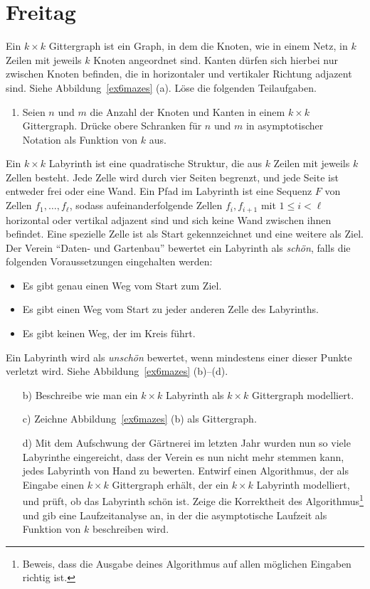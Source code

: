 \documentclass{uebung_cs}
\begin{document}
\section*{Freitag}

\begin{aufgabe}
	Ein $k\times k$ Gittergraph ist ein Graph, in dem die Knoten, wie in einem Netz, in $k$ Zeilen mit jeweils $k$ Knoten angeordnet sind.
	Kanten dürfen sich hierbei nur zwischen Knoten befinden, die in horizontaler und vertikaler Richtung adjazent sind.
	Siehe Abbildung~\ref{ex6mazes} (a).
	Löse die folgenden Teilaufgaben.
	\begin{enumerate}
		\item Seien $n$ und $m$ die Anzahl der Knoten und Kanten in einem $k\times k$ Gittergraph.
		Drücke obere Schranken für $n$ und $m$ in asymptotischer Notation als Funktion von $k$ aus.
	\end{enumerate}
	Ein $k\times k$ Labyrinth ist eine quadratische Struktur, die aus $k$ Zeilen mit jeweils $k$ Zellen besteht.
	Jede Zelle wird durch vier Seiten begrenzt, und jede Seite ist entweder frei oder eine Wand.
	Ein Pfad im Labyrinth ist eine Sequenz $F$ von Zellen $f_1,\ldots, f_\ell$, sodass aufeinanderfolgende Zellen $f_i, f_{i+1}$ mit $1 \leq i < \ell$ horizontal oder vertikal adjazent sind und sich keine Wand zwischen ihnen befindet.
	Eine spezielle Zelle ist als Start gekennzeichnet und eine weitere als Ziel.\\
	Der Verein \enquote{Daten- und Gartenbau} bewertet ein Labyrinth als \textit{schön}, falls die folgenden Voraussetzungen eingehalten werden:
	\begin{itemize}
		\item Es gibt genau einen Weg vom Start zum Ziel.
		\item Es gibt einen Weg vom Start zu jeder anderen Zelle des Labyrinths.
		\item Es gibt keinen Weg, der im Kreis führt.
	\end{itemize}
	Ein Labyrinth wird als \textit{unschön} bewertet, wenn mindestens einer dieser Punkte verletzt wird.
	Siehe Abbildung~\ref{ex6mazes} (b)--(d).
	\begin{enumerate}
		\item[b)] Beschreibe wie man ein $k\times k$ Labyrinth als $k\times k$ Gittergraph modelliert.
		\item[c)] Zeichne Abbildung~\ref{ex6mazes} (b) als Gittergraph.
		\item[d)] Mit dem Aufschwung der Gärtnerei im letzten Jahr wurden nun so viele Labyrinthe eingereicht, dass der Verein es nun nicht mehr stemmen kann, jedes Labyrinth von Hand zu bewerten.
		Entwirf einen Algorithmus, der als Eingabe einen $k\times k$ Gittergraph erhält, der ein $k\times k$ Labyrinth modelliert, und prüft, ob das Labyrinth schön ist.
		Zeige die Korrektheit des Algorithmus\footnote{Beweis, dass die Ausgabe deines Algorithmus auf allen möglichen Eingaben richtig ist.} und gib eine Laufzeitanalyse an, in der die asymptotische Laufzeit als Funktion von $k$ beschreiben wird.
	\end{enumerate}
\end{aufgabe}
\end{document}
